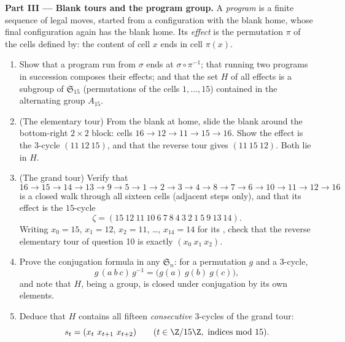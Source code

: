 \begin{problem}
\medskip
\noindent\textbf{Part III --- Blank tours and the program
group.} A \emph{program} is a finite sequence of legal moves,
started from a configuration with the blank home, whose final
configuration again has the blank home. Its \emph{effect} is the
permutation $\pi$ of the cells defined by: the content of cell $x$
ends in cell $\pi(x)$.
\begin{enumerate}[resume]
  \item Show that a program run from $\sigma$ ends at $\sigma
        \circ \pi^{-1}$; that running two programs in succession
        composes their effects; and that the set $H$ of all
        effects is a subgroup of $\mathfrak{S}_{15}$ (permutations
        of the cells $1, \dots, 15$) contained in the alternating
        group $A_{15}$.
  \item (The elementary tour) From the blank at home, slide the
        blank around the bottom-right $2 \times 2$ block: cells
        $16 \to 12 \to 11 \to 15 \to 16$. Show the effect is the
        $3$-cycle $(11\ 12\ 15)$, and that the reverse tour gives
        $(11\ 15\ 12)$. Both lie in $H$.
  \item (The grand tour) Verify that
        \[
        16 \to 15 \to 14 \to 13 \to 9 \to 5 \to 1 \to 2 \to 3
        \to 4 \to 8 \to 7 \to 6 \to 10 \to 11 \to 12 \to 16
        \]
        is a closed walk through all sixteen cells (adjacent steps
        only), and that its effect is the $15$-cycle
        \[
        \zeta = (15\ 12\ 11\ 10\ 6\ 7\ 8\ 4\ 3\ 2\ 1\ 5\ 9\ 13\
        14) .
        \]
        Writing $x_0 = 15$, $x_1 = 12$, $x_2 = 11$, \dots, $x_{14}
        = 14$ for its \omterm{def:b2:structures:sn}{cycle} , check that the reverse
        elementary tour of question 10 is exactly $(x_0\ x_1\
        x_2)$.
  \item Prove the conjugation formula in any $\mathfrak{S}_n$: for
        a permutation $g$ and a $3$-cycle,
        \[
        g\,(a\ b\ c)\,g^{-1} = \bigl(g(a)\ g(b)\ g(c)\bigr),
        \]
        and note that $H$, being a group, is closed under
        conjugation by its own elements.
  \item Deduce that $H$ contains all fifteen \emph{consecutive}
        $3$-cycles of the grand tour:
        \[
        s_t = (x_t\ x_{t+1}\ x_{t+2}) \qquad (t \in \Z/15\Z,
        \text{ indices mod } 15).
        \]
\end{enumerate}


\end{problem}
